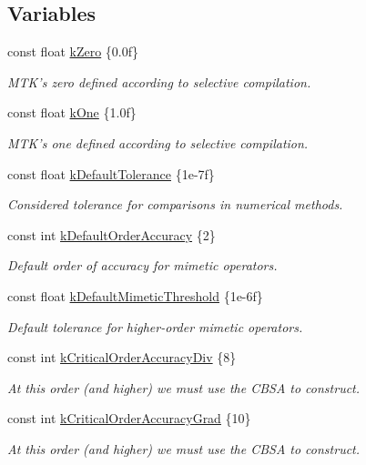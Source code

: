 \subsection*{Variables}
\begin{DoxyCompactItemize}
\item 
const float \hyperlink{group__c01-roots_ga59a451a5fae30d59649bcda274fea271}{k\+Zero} \{0.\+0f\}
\begin{DoxyCompactList}\small\item\em M\+T\+K's zero defined according to selective compilation. \end{DoxyCompactList}\item 
const float \hyperlink{group__c01-roots_ga26407c24d43b6b95480943340d285c71}{k\+One} \{1.\+0f\}
\begin{DoxyCompactList}\small\item\em M\+T\+K's one defined according to selective compilation. \end{DoxyCompactList}\item 
const float \hyperlink{group__c01-roots_gae914b125d81d1b97e0aee7bbc7739786}{k\+Default\+Tolerance} \{1e-\/7f\}
\begin{DoxyCompactList}\small\item\em Considered tolerance for comparisons in numerical methods. \end{DoxyCompactList}\item 
const int \hyperlink{group__c01-roots_ga0d95560098eb36420511103637b6952f}{k\+Default\+Order\+Accuracy} \{2\}
\begin{DoxyCompactList}\small\item\em Default order of accuracy for mimetic operators. \end{DoxyCompactList}\item 
const float \hyperlink{group__c01-roots_ga35718d949bdc81a08a9cc8ebbe3478a2}{k\+Default\+Mimetic\+Threshold} \{1e-\/6f\}
\begin{DoxyCompactList}\small\item\em Default tolerance for higher-\/order mimetic operators. \end{DoxyCompactList}\item 
const int \hyperlink{group__c01-roots_ga0898eef2108473e44a5223932d571c31}{k\+Critical\+Order\+Accuracy\+Div} \{8\}
\begin{DoxyCompactList}\small\item\em At this order (and higher) we must use the C\+B\+S\+A to construct. \end{DoxyCompactList}\item 
const int \hyperlink{group__c01-roots_ga295dd2f403c775ecd942c22b5a777496}{k\+Critical\+Order\+Accuracy\+Grad} \{10\}
\begin{DoxyCompactList}\small\item\em At this order (and higher) we must use the C\+B\+S\+A to construct. \end{DoxyCompactList}\end{DoxyCompactItemize}


